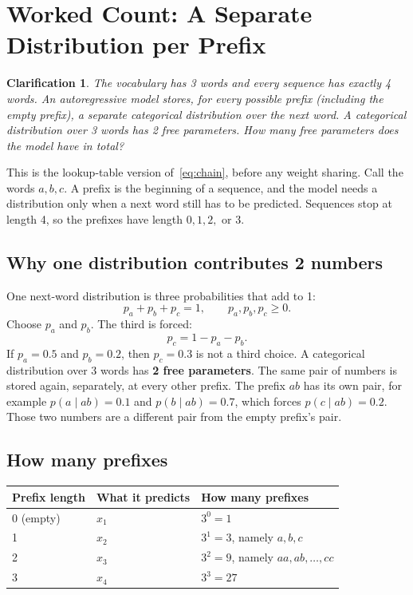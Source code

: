 \documentclass[11pt]{article}
\newtheorem*{clarification}{Clarification}
\begin{document}
\section{Worked Count: A Separate Distribution per Prefix}

\begin{clarification}
The vocabulary has 3 words and every sequence has exactly 4 words. An
autoregressive model stores, for every possible prefix (including the empty
prefix), a separate categorical distribution over the next word. A
categorical distribution over 3 words has 2 free parameters. How many free
parameters does the model have in total?
\end{clarification}

This is the lookup-table version of~\eqref{eq:chain}, before any weight
sharing. Call the words \(a,b,c\). A prefix is the beginning of a sequence,
and the model needs a distribution only when a next word still has to be
predicted. Sequences stop at length 4, so the prefixes have length
\(0,1,2,\) or \(3\).

\subsection{Why one distribution contributes 2 numbers}

One next-word distribution is three probabilities that add to 1:
\[
p_a+p_b+p_c=1, \qquad p_a,p_b,p_c\ge 0.
\]
Choose \(p_a\) and \(p_b\). The third is forced:
\[
p_c=1-p_a-p_b.
\]
If \(p_a=0.5\) and \(p_b=0.2\), then \(p_c=0.3\) is not a third choice. A
categorical distribution over 3 words has \textbf{2 free parameters}. The
same pair of numbers is stored again, separately, at every other prefix.
The prefix \(ab\) has its own pair, for example
\(p(a\mid ab)=0.1\) and \(p(b\mid ab)=0.7\), which forces
\(p(c\mid ab)=0.2\). Those two numbers are a different pair from the empty
prefix's pair.

\subsection{How many prefixes}

\begin{center}
\begin{tabular}{@{}lll@{}}
\toprule
Prefix length & What it predicts & How many prefixes \\
\midrule
0 (empty) & \(x_1\) & \(3^0=1\) \\
1 & \(x_2\) & \(3^1=3\), namely \(a,b,c\) \\
2 & \(x_3\) & \(3^2=9\), namely \(aa,ab,\ldots,cc\) \\
3 & \(x_4\) & \(3^3=27\) \\
\bottomrule
\end{tabular}
\end{center}
\end{document}
